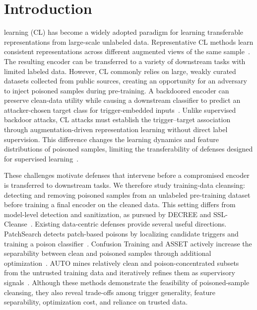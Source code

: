 \documentclass[10pt,journal]{IEEEtran}
\begin{document}
\section{Introduction}\label{sec:introduction}
 learning (CL) has become a widely adopted paradigm for learning transferable representations from large-scale unlabeled data. Representative CL methods learn consistent representations across different augmented views of the same sample~\cite{Chen2020SimCLR,He2020MoCo,Grill2020BYOL}. The resulting encoder can be transferred to a variety of downstream tasks with limited labeled data. However, CL commonly relies on large, weakly curated datasets collected from public sources, creating an opportunity for an adversary to inject poisoned samples during pre-training. A backdoored encoder can preserve clean-data utility while causing a downstream classifier to predict an attacker-chosen target class for trigger-embedded inputs~\cite{Carlini2022Poisoning,Saha2022SSLBackdoor,Liu2022PoisonedEncoder}. Unlike supervised backdoor attacks, CL attacks must establish the trigger--target association through augmentation-driven representation learning without direct label supervision. This difference changes the learning dynamics and feature distributions of poisoned samples, limiting the transferability of defenses designed for supervised learning~\cite{Li2023CTRL,Li2024Difficulty}.

These challenges motivate defenses that intervene before a compromised encoder is transferred to downstream tasks. We therefore study training-data cleansing: detecting and removing poisoned samples from an unlabeled pre-training dataset before training a final encoder on the cleaned data. This setting differs from model-level detection and sanitization, as pursued by DECREE and SSL-Cleanse~\cite{Feng2023DECREE,Zheng2024SSLCleanse}. Existing data-centric defenses provide several useful directions. PatchSearch detects patch-based poisons by localizing candidate triggers and training a poison classifier~\cite{Tejankar2023PatchSearch}. Confusion Training and ASSET actively increase the separability between clean and poisoned samples through additional optimization~\cite{Qi2023Proactive,Pan2023ASSET}. AUTO mines relatively clean and poison-concentrated subsets from the untrusted training data and iteratively refines them as supervisory signals~\cite{Chen2025AUTO}. Although these methods demonstrate the feasibility of poisoned-sample cleansing, they also reveal trade-offs among trigger generality, feature separability, optimization cost, and reliance on trusted data.
\end{document}
